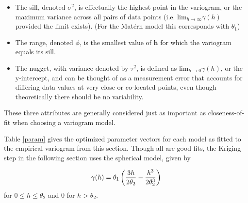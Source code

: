 \documentclass[12pt,twoside]{reedthesis}
\begin{document}
\begin{itemize}
\item The sill, denoted $\sigma^2$, is effectually the highest point in the variogram, or the maximum variance across all pairs of data points (i.e. $\text{lim}_{h\to\infty}\gamma(h)$ provided the limit exists). (For the Mat\'ern model this corresponds with $\theta_1$) 

\item The range, denoted $\phi$, is the smallest value of $\mathbf{h}$ for which the variogram equals its sill. 

\item The nugget, with variance denoted by $\tau^2$, is defined as $\text{lim}_{h\to0}\gamma(h)$, or the y-intercept,  and can be thought of as a measurement error that accounts for differing data values at very close or co-located points, even though theoretically there should be no variability. 

\end{itemize}

These three attributes are generally considered just as important as closeness-of-fit when choosing a variogram model. 


Table \ref{param} gives the optimized parameter vectors for each model as fitted to the empirical variogram from this section. Though all are good fits, the Kriging step in the following section uses the spherical model, given by

\begin{align*}
\gamma(h) = \theta_1 \left ( {{3h}\over{2\theta_2}} - {{h^3}\over{2\theta_2^3}} \right )
\end{align*}
for $0 \leq h \leq \theta_2$ and 0 for $h > \theta_2$. \\
	
	   
	  
	
	
	   
	  
\end{document}
